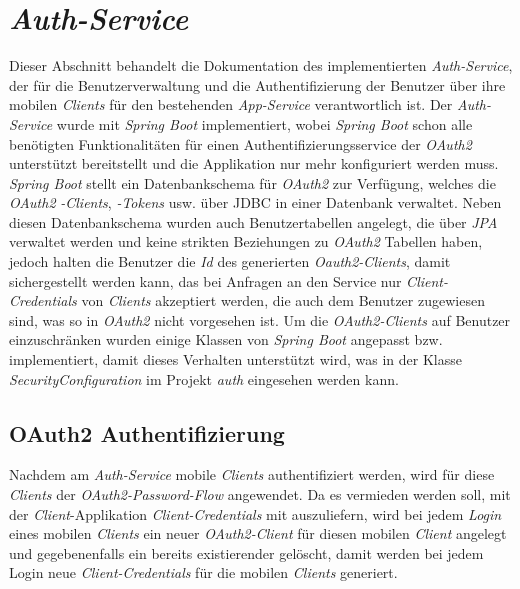 \documentclass[]{article}
\begin{document}
{{{{\section{\emph{Auth-Service}}
Dieser Abschnitt behandelt die Dokumentation des implementierten \emph{Auth-Service}, der für die Benutzerverwaltung und die Authentifizierung der Benutzer über ihre mobilen \emph{Clients} für den bestehenden \emph{App-Service} verantwortlich ist. Der \emph{Auth-Service} wurde mit \emph{Spring Boot} implementiert, wobei \emph{Spring Boot} schon alle benötigten Funktionalitäten für einen Authentifizierungsservice der \emph{OAuth2} unterstützt bereitstellt und die Applikation nur mehr konfiguriert werden muss.
\newline
\newline
\emph{Spring Boot} stellt ein Datenbankschema für \emph{OAuth2} zur Verfügung, welches die \emph{OAuth2} \emph{-Clients}, \emph{-Tokens} usw. über JDBC in einer Datenbank verwaltet. Neben diesen Datenbankschema wurden auch Benutzertabellen angelegt, die über \emph{JPA} verwaltet werden und keine strikten Beziehungen zu \emph{OAuth2} Tabellen haben, jedoch halten die Benutzer die \emph{Id} des generierten \emph{Oauth2-Clients}, damit sichergestellt werden kann, das bei Anfragen an den Service nur \emph{Client-Credentials} von \emph{Clients} akzeptiert werden, die auch dem Benutzer zugewiesen sind, was so in \emph{OAuth2} nicht vorgesehen ist.
\newline
\newline
Um die \emph{OAuth2-Clients} auf Benutzer einzuschränken wurden einige Klassen von \emph{Spring Boot} angepasst bzw. implementiert, damit dieses Verhalten unterstützt wird, was in der Klasse \emph{SecurityConfiguration} im Projekt \emph{auth} eingesehen werden kann.

\subsection{OAuth2 Authentifizierung}
Nachdem am \emph{Auth-Service} mobile \emph{Clients} authentifiziert werden, wird für diese \emph{Clients} der \emph{OAuth2-Password-Flow} angewendet. Da es vermieden werden soll, mit  der \emph{Client}-Applikation \emph{Client-Credentials} mit auszuliefern, wird bei jedem \emph{Login} eines mobilen \emph{Clients} ein neuer \emph{OAuth2-Client} für diesen mobilen \emph{Client}  angelegt und gegebenenfalls ein bereits existierender gelöscht, damit werden bei jedem Login neue \emph{Client-Credentials} für die mobilen \emph{Clients} generiert.

}}}}
\end{document}
